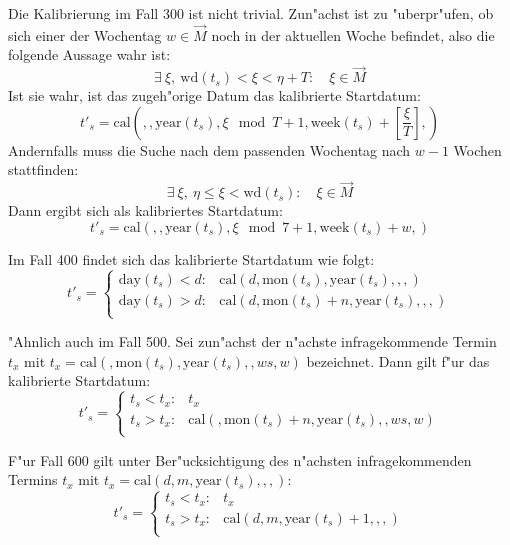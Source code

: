 \documentclass[a4paper]{article}
\newcommand*{\dayf}{\mathrm{day}}
\newcommand*{\monf}{\mathrm{mon}}
\newcommand*{\yearf}{\mathrm{year}}
\newcommand*{\wdf}{\mathrm{wd}}
\newcommand*{\weekf}{\mathrm{week}}
\newcommand*{\calf}{\mathrm{cal}}
\numberwithin{equation}{section}
\begin{document}
Die Kalibrierung im Fall 300 ist nicht trivial. Zun"achst ist zu "uberpr"ufen,
ob sich einer der Wochentag $w \in \vec{M}$ noch in der aktuellen Woche
befindet, also die folgende Aussage wahr ist:
\begin{equation}
  \exists\ \xi,\ \wdf(t_s) < \xi < \eta + T :\quad \xi \in \vec{M}
\end{equation}
Ist sie wahr, ist das zugeh"orige Datum das kalibrierte Startdatum:
\begin{equation}
  t'_s = \calf(, , \yearf(t_s), \xi \mod T + 1, \weekf(t_s) +
  \left[\frac{\xi}{T}\right], )
\end{equation}
Andernfalls muss die Suche nach dem passenden Wochentag nach $w - 1$ Wochen
stattfinden:
\begin{equation}
  \exists\ \xi,\ \eta \le \xi < \wdf(t_s) :\quad \xi \in \vec{M}
\end{equation}
Dann ergibt sich als kalibriertes Startdatum:
\begin{equation}
  t'_s = \calf(, , \yearf(t_s), \xi \mod 7 + 1, \weekf(t_s) + w, )
\end{equation}

\noindent Im Fall 400 findet sich das kalibrierte Startdatum wie folgt:
\begin{equation}
  t'_s = \left\{\begin{array}{ll}
  \dayf(t_s) < d: & \calf(d, \monf(t_s), \yearf(t_s), , , ) \\
  \dayf(t_s) > d: & \calf(d, \monf(t_s) + n, \yearf(t_s), , , ) \\
  \end{array}\right.
\end{equation}

\noindent "Ahnlich auch im Fall 500. Sei zun"achst der n"achste infragekommende
Termin $t_x$ mit $t_x = \calf(, \monf(t_s), \yearf(t_s), , ws, w)$ bezeichnet.
Dann gilt f"ur das kalibrierte Startdatum:
\begin{equation}
  t'_s = \left\{\begin{array}{ll}
  t_s < t_x : & t_x \\
  t_s > t_x : & \calf(, \monf(t_s) + n, \yearf(t_s), , ws, w) \\
  \end{array}\right.
\end{equation}

\noindent F"ur Fall 600 gilt unter Ber"ucksichtigung des n"achsten
infragekommenden Termins $t_x$ mit $t_x = \calf(d, m, \yearf(t_s), , , )$:
\begin{equation}
t'_s = \left\{\begin{array}{ll}
t_s < t_x : & t_x \\
t_s > t_x : & \calf(d, m, \yearf(t_s) + 1, , , ) \\
\end{array}\right.
\end{equation}
\end{document}
